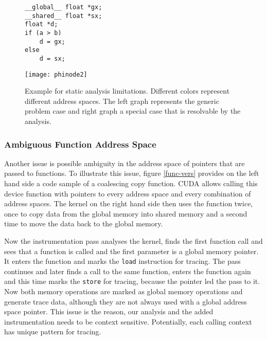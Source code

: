 \begin{figure}[t]
		\begin{minipage}{0.35\textwidth}

		\begin{lstlisting}[style=c]
__global__ float *gx;
__shared__ float *sx;
float *d;
if (a > b)
	d = gx;
else 
	d = sx;	\end{lstlisting}
			\end{minipage}\hfill
	\begin{minipage}{0.6\textwidth}
		\centering
		\texttt{[image: phinode2]}
	\end{minipage}\hfill
	\caption{Example for static analysis limitations. Different colors represent different address spaces. The left graph represents the generic problem case and right graph a special case that is resolvable by the analysis.}
	\label{phinodes}
\end{figure}

\subsubsection{Ambiguous Function Address Space}\label{func-vers-sec}
Another issue is possible ambiguity in the address space of pointers that are passed to functions. To illustrate this issue, figure \ref{func-vers} provides on the left hand side a code sample of a coalescing copy function. CUDA allows calling this device function with pointers to every address space and every combination of address spaces. The kernel on the right hand side then uses the function twice, once to copy data from the global memory into shared memory and a second time to move the data back to the global memory.

Now the instrumentation pass analyses the kernel, finds the first function call and sees that a function is called and the first
parameter is a global memory pointer. It enters the function and marks the \verb|load| instruction for tracing. The pass continues and later finds a call to the same function, enters the function again and this time marks the \verb|store| for tracing, because the pointer
led the pass to it. Now both memory operations are marked as global memory operations and generate trace data, although they are not always used with a global address space pointer. This issue is the reason, our analysis and the added
instrumentation needs to be context sensitive. Potentially, each calling context has unique pattern for tracing.


